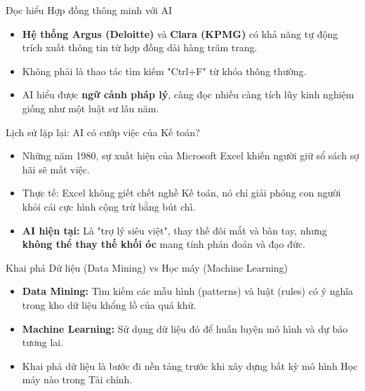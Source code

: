 \documentclass[aspectratio=169,12pt]{beamer}
\begin{document}
\begin{frame}{Đọc hiểu Hợp đồng thông minh với AI}
    \begin{itemize}
        \item \textbf{Hệ thống Argus (Deloitte)} và \textbf{Clara (KPMG)} có khả năng tự động trích xuất thông tin từ hợp đồng dài hàng trăm trang.
        \item Không phải là thao tác tìm kiếm "Ctrl+F" từ khóa thông thường.
        \item AI hiểu được \textbf{ngữ cảnh pháp lý}, càng đọc nhiều càng tích lũy kinh nghiệm giống như một luật sư lâu năm.
    \end{itemize}
\end{frame}

\begin{frame}{Lịch sử lặp lại: AI có cướp việc của Kế toán?}
    \begin{itemize}
        \item Những năm 1980, sự xuất hiện của Microsoft Excel khiến người giữ sổ sách sợ hãi sẽ mất việc.
        \item Thực tế: Excel không giết chết nghề Kế toán, nó chỉ giải phóng con người khỏi cái cực hình cộng trừ bằng bút chì.
        \item \textbf{AI hiện tại:} Là "trợ lý siêu việt", thay thế đôi mắt và bàn tay, nhưng \textbf{không thể thay thế khối óc} mang tính phán đoán và đạo đức.
    \end{itemize}
\end{frame}

\begin{frame}{Khai phá Dữ liệu (Data Mining) vs Học máy (Machine Learning)}
    \begin{itemize}
        \item \textbf{Data Mining:} Tìm kiếm các mẫu hình (patterns) và luật (rules) có ý nghĩa trong kho dữ liệu khổng lồ của quá khứ.
        \item \textbf{Machine Learning:} Sử dụng dữ liệu đó để huấn luyện mô hình và dự báo tương lai.
        \item Khai phá dữ liệu là bước đi nền tảng trước khi xây dựng bất kỳ mô hình Học máy nào trong Tài chính.
    \end{itemize}
\end{frame}
\end{document}
